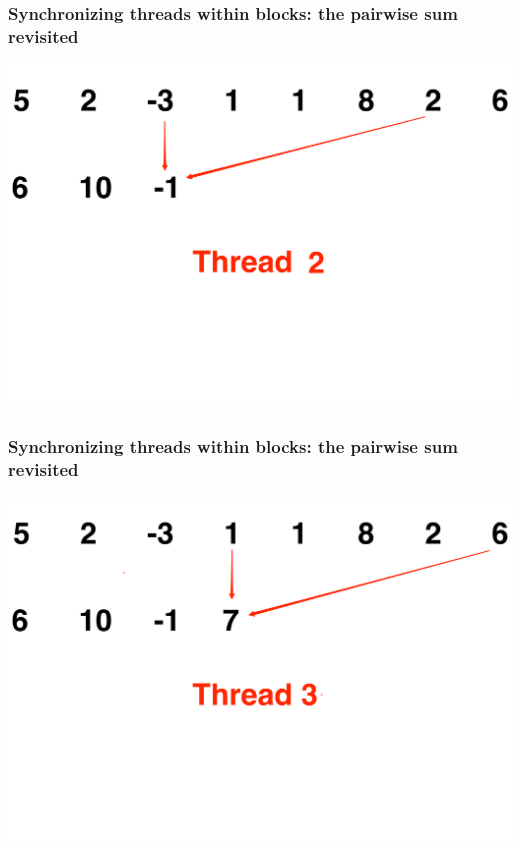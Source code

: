 \documentclass[handout]{beamer}
\numberwithin{equation}{section}
\begin{document}
\begin{frame}
\frametitle{Synchronizing threads within blocks: the pairwise sum revisited}
 \begin{center}
\includegraphics[scale = .15]{../../fig/psum3}
\end{center}
\end{frame}

\begin{frame}
\frametitle{Synchronizing threads within blocks: the pairwise sum revisited}
 \begin{center}
\includegraphics[scale = .25]{../../fig/psum4}
\end{center}
\end{frame}
\end{document}
